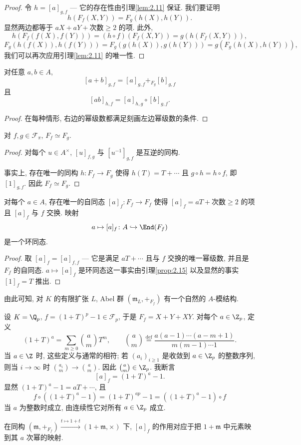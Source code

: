 \begin{proof}
令 $h=[a]_{g,f}$ — 它的存在性由引理\ref{lem:2.11} 保证. 我们要证明
\[
h(F_f(X,Y))=F_g(h(X),h(Y)).
\]
显然两边都等于 $aX+aY+\text{次数}\ge 2\text{ 的项}$. 此外,
\[
h(F_f(f(X),f(Y)))=(h\circ f)(F_f(X,Y))=g(h(F_f(X,Y))),
\]
\[
F_g(h(f(X)),h(f(Y)))=F_g(g(h(X)),g(h(Y)))=g(F_g(h(X),h(Y))),
\]
我们可以再次应用引理\ref{lem:2.11} 的唯一性.
\end{proof}

\begin{proposition}\label{prop:2.15}
对任意 $a,b\in A$,
\[
[a+b]_{g,f}=[a]_{g,f}+_{F_g}[b]_{g,f}
\]
且
\[
[ab]_{h,f}=[a]_{h,g}\circ[b]_{g,f}.
\]
\end{proposition}

\begin{proof}
在每种情形, 右边的幂级数都满足刻画左边幂级数的条件.
\end{proof}

\begin{corollary}\label{cor:2.16}
对 $f,g\in\mathcal{F}_{\pi}$, $F_f\simeq F_g$.
\end{corollary}

\begin{proof}
对每个 $u\in A^{\times}$, $[u]_{f,g}$ 与 $[u^{-1}]_{g,f}$ 是互逆的同构.

事实上, 存在唯一的同构 $h\colon F_f\to F_g$ 使得 $h(T)=T+\cdots$ 且 $g\circ h=h\circ f$, 即 $[1]_{g,f}$. 因此 $F_f\simeq F_g$.
\end{proof}

\begin{corollary}\label{cor:2.17}
对每个 $a\in A$, 存在唯一的自同态 $[a]_f\colon F_f\to F_f$ 使得 $[a]_f=aT+\text{次数}\ge 2\text{ 的项}$ 且 $[a]_f$ 与 $f$ 交换. 映射
\[
a\mapsto[a]_f\colon A\hookrightarrow\End(F_f)
\]
是一个环同态.
\end{corollary}

\begin{proof}
取 $[a]_f=[a]_{f,f}$ — 它是满足 $aT+\cdots$ 且与 $f$ 交换的唯一幂级数, 并且是 $F_f$ 的自同态. $a\mapsto[a]_f$ 是环同态这一事实由引理\ref{prop:2.15} 以及显然的事实 $[1]_f=T$ 推出.
\end{proof}

由此可知, 对 $K$ 的有限扩张 $L$, Abel 群 $(\mathfrak{m}_L,+_{F_f})$ 有一个自然的 $A$-模结构.

\begin{example}\label{ex:2.18}
设 $K=\Q_p$, $f=(1+T)^p-1\in\mathcal{F}_p$, 于是 $F_f=X+Y+XY$. 对每个 $a\in\Z_p$, 定义
\[
(1+T)^a=\sum_{m\ge 0}\binom{a}{m}T^m,\qquad \binom{a}{m}\stackrel{\mathrm{def}}{=}\frac{a(a-1)\cdots(a-m+1)}{m(m-1)\cdots 1}.
\]
当 $a\in\Z$ 时, 这些定义与通常的相符; 若 $(a_i)_{i\ge 1}$ 是收敛到 $a\in\Z_p$ 的整数序列, 则当 $i\to\infty$ 时 $\binom{a_i}{m}\to\binom{a}{m}$. 因此 $\binom{a}{m}\in\Z_p$. 我断言
\[
[a]_f=(1+T)^a-1.
\]
显然 $(1+T)^a-1=aT+\cdots$, 且
\[
f\circ((1+T)^a-1)=(1+T)^{ap}-1=((1+T)^a-1)\circ f
\]
当 $a$ 为整数时成立, 由连续性它对所有 $a\in\Z_p$ 成立.

在同构 $(\mathfrak{m},+_{F_f})\xrightarrow{t\mapsto 1+t}(1+\mathfrak{m},\times)$ 下, $[a]_f$ 的作用对应于把 $1+\mathfrak{m}$ 中元素映到其 $a$ 次幂的映射.
\end{example}

